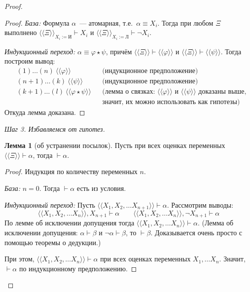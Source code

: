 \documentclass[a4paper,11pt]{article}
\theoremstyle{definition}
\newtheorem*{lmm}{Лемма}
\newcommand{\proves}{\vdash}
\newcommand{\True}{\text{И}}
\newcommand{\False}{\text{Л}}
\newcommand{\cn}[1]{\langle\!\!\langle #1 \rangle\!\!\rangle}
\begin{document}
\begin{proof}
\begin{proof}
\emph{База:} Формула $\alpha$~--- атомарная, т.е.\ $\alpha \equiv X_i$. Тогда
при любом $\Xi$ выполнено $\cn{\Xi}_{X_i := \True} \proves X_i$ и
$\cn{\Xi}_{X_i := \False} \proves \neg X_i$.

\emph{Индукционный переход:} $\alpha \equiv \varphi \star \psi$, причём
$\cn{\Xi} \proves \cn{\varphi}$ и $\cn{\Xi} \proves \cn{\psi}$. Тогда построим
вывод:
\begin{align*}
&(1)\dots(n)\ \cn{\varphi} &&\text{(индукционное предположение)}\\
&(n+1)\dots(k)\ \cn{\psi} &&\text{(индукционное предположение)}\\
&(k+1)\dots(l)\ \cn{\varphi \star \psi} &&\text{(лемма о связках: $\cn{\varphi}$ и $\cn{\psi}$ доказаны выше,}\\
&&&\text{значит, их можно использовать как гипотезы)}
\end{align*}
Откуда лемма доказана.
\end{proof}

\emph{Шаг 3. Избавляемся от гипотез.}

\begin{lmm}[об устранении посылок]
Пусть при всех оценках переменных $\cn{\Xi} \proves \alpha$, тогда $\proves
\alpha$.
\end{lmm}
\begin{proof}
Индукция по количеству переменных $n$.

\emph{База:} $n = 0$. Тогда $\proves \alpha$ есть из условия.

\emph{Индукционный переход:} Пусть $\cn{X_1, X_2, \dots X_{n+1}} \proves
\alpha$. Рассмотрим выводы:
\[
\cn{X_1, X_2, \dots X_n}, X_{n+1} \proves \alpha
\qquad
\cn{X_1, X_2, \dots X_n}, \neg X_{n+1} \proves \alpha
\]
По лемме об исключении допущения тогда $\cn{X_1, X_2, \dots X_n} \proves \alpha$.
(Лемма об исключении допущения: $\alpha \proves \beta$ и $\neg\alpha \proves
\beta$, то $\proves \beta$. Доказывается очень просто с помощью теоремы о
дедукции.)

При этом, $\cn{X_1, X_2, \dots X_n} \proves \alpha$ при всех оценках переменных
$X_1, \dots X_n$. Значит, $\proves \alpha$ по индукционному предположению.
\end{proof}
\end{proof}
\end{document}
